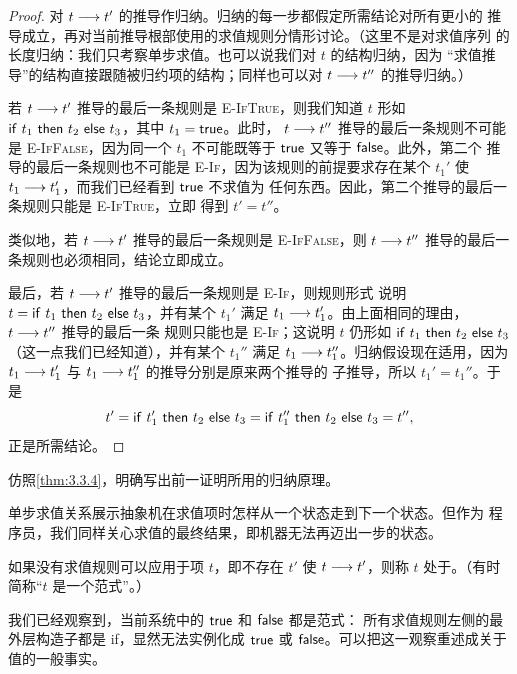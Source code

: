 \begin{proof}
对 \(t\mathrel{\longrightarrow} t'\) 的推导作归纳。归纳的每一步都假定所需结论对所有更小的
推导成立，再对当前推导根部使用的求值规则分情形讨论。（这里不是对求值序列
的长度归纳：我们只考察单步求值。也可以说我们对 \(t\) 的结构归纳，因为
“求值推导”的结构直接跟随被归约项的结构；同样也可以对
\(t\mathrel{\longrightarrow} t''\) 的推导归纳。）

若 \(t\mathrel{\longrightarrow} t'\) 推导的最后一条规则是 \textsc{E-IfTrue}，则我们知道
\(t\) 形如 \(\mathsf{if}\ t_1\ \mathsf{then}\ t_2\ \mathsf{else}\ t_3\)，其中 \(t_1=\mathsf{true}\)。此时，
\(t\mathrel{\longrightarrow} t''\) 推导的最后一条规则不可能是 \textsc{E-IfFalse}，因为同一个
\(t_1\) 不可能既等于 \(\mathsf{true}\) 又等于 \(\mathsf{false}\)。此外，第二个
推导的最后一条规则也不可能是 \textsc{E-If}，因为该规则的前提要求存在某个
\(t_1'\) 使 \(t_1\mathrel{\longrightarrow} t_1'\)，而我们已经看到 \(\mathsf{true}\) 不求值为
任何东西。因此，第二个推导的最后一条规则只能是 \textsc{E-IfTrue}，立即
得到 \(t'=t''\)。

类似地，若 \(t\mathrel{\longrightarrow} t'\) 推导的最后一条规则是 \textsc{E-IfFalse}，则
\(t\mathrel{\longrightarrow} t''\) 推导的最后一条规则也必须相同，结论立即成立。

最后，若 \(t\mathrel{\longrightarrow} t'\) 推导的最后一条规则是 \textsc{E-If}，则规则形式
说明 \(t=\mathsf{if}\ t_1\ \mathsf{then}\ t_2\ \mathsf{else}\ t_3\)，并有某个 \(t_1'\) 满足
\(t_1\mathrel{\longrightarrow} t_1'\)。由上面相同的理由，\(t\mathrel{\longrightarrow} t''\) 推导的最后一条
规则只能也是 \textsc{E-If}；这说明 \(t\) 仍形如
\(\mathsf{if}\ t_1\ \mathsf{then}\ t_2\ \mathsf{else}\ t_3\)（这一点我们已经知道），并有某个 \(t_1''\)
满足 \(t_1\mathrel{\longrightarrow} t_1''\)。归纳假设现在适用，因为
\(t_1\mathrel{\longrightarrow} t_1'\) 与 \(t_1\mathrel{\longrightarrow} t_1''\) 的推导分别是原来两个推导的
子推导，所以 \(t_1'=t_1''\)。于是
\[
 t'=\mathsf{if}\ t_1'\ \mathsf{then}\ t_2\ \mathsf{else}\ t_3
    =\mathsf{if}\ t_1''\ \mathsf{then}\ t_2\ \mathsf{else}\ t_3=t'',
\]
正是所需结论。
\end{proof}

\begin{exercise}[\(\star\)]
\label{ex:3.5.5}
仿照\cref{thm:3.3.4}，明确写出前一证明所用的归纳原理。
\end{exercise}

单步求值关系展示抽象机在求值项时怎样从一个状态走到下一个状态。但作为
程序员，我们同样关心求值的最终结果，即机器无法再迈出一步的状态。

\begin{definition}
\label{def:3.5.6}
如果没有求值规则可以应用于项 \(t\)，即不存在 \(t'\) 使
\(t\mathrel{\longrightarrow} t'\)，则称 \(t\) 处于。（有时
简称“\(t\) 是一个范式”。）
\end{definition}

我们已经观察到，当前系统中的 \(\mathsf{true}\) 和 \(\mathsf{false}\) 都是范式：
所有求值规则左侧的最外层构造子都是 if，显然无法实例化成
\(\mathsf{true}\) 或 \(\mathsf{false}\)。可以把这一观察重述成关于值的一般事实。

